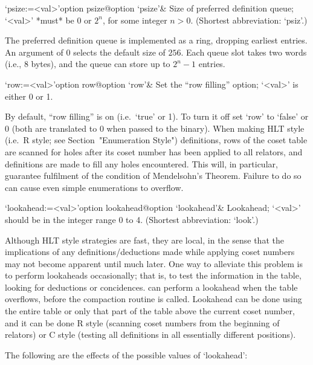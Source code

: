 \>`psize:=<val>'{option psize}@{option `psize'}&
Size of preferred definition queue; `<val>' *must* be 0 or $2^n$,  for
some integer $n>0$. (Shortest abbreviation: `psiz'.)

The  preferred definition  queue is  implemented as  a  ring, dropping
earliest entries. An argument of 0 selects  the default size of $256$.
Each  queue slot takes two words (i.e., 8 bytes),  and the  queue  can
store up to $2^n-1$ entries.

\enditems


\beginitems

\>`row:=<val>'{option row}@{option `row'}&
Set the ``row filling'' option; `<val>' is either 0 or 1.

By default, ``row filling'' is on (i.e.~`true' or 1). To turn  it  off
set `row' to `false' or 0 (both are translated to 0 when passed to the
{\ACE}  binary).  When   making   HLT   style   (i.e.~R   style;   see
Section~"Enumeration Style") definitions, rows of the coset table  are
scanned for holes after its coset  number  has  been  applied  to  all
relators, and definitions are made to fill any holes encountered. This
will,  in  particular,  guarantee  fulfilment  of  the  condition   of
Mendelsohn's  Theorem.  Failure  to  do  so  can  cause  even   simple
enumerations to overflow.

\>`lookahead:=<val>'{option lookahead}@{option `lookahead'}&
Lookahead; `<val>' should be in the integer range 0 to 4.
(Shortest abbreviation: `look'.)

Although HLT style strategies are fast, they are local, in  the  sense
that  the  implications  of  any  definitions/deductions  made   while
applying coset numbers may not become apparent until much  later.  One
way to alleviate this problem is to perform  lookaheads  occasionally;
that is, to test the information in the table, looking for  deductions
or  concidences.  {\ACE}  can  perform  a  lookahead  when  the  table
overflows, before the compaction routine is called. Lookahead  can  be
done using the entire table or only that part of the table  above  the
current coset number, and it  can  be  done  R style  (scanning  coset
numbers from the  beginning  of  relators)  or  C style  (testing  all
definitions in all essentially different positions).

The following are the effects of the possible values of `lookahead':


